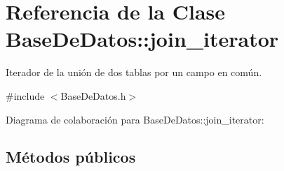 \hypertarget{classBaseDeDatos_1_1join__iterator}{}\section{Referencia de la Clase Base\+De\+Datos\+:\+:join\+\_\+iterator}
\label{classBaseDeDatos_1_1join__iterator}


Iterador de la unión de dos tablas por un campo en común.  




{\ttfamily \#include $<$Base\+De\+Datos.\+h$>$}



Diagrama de colaboración para Base\+De\+Datos\+:\+:join\+\_\+iterator\+:
\subsection*{Métodos públicos}
